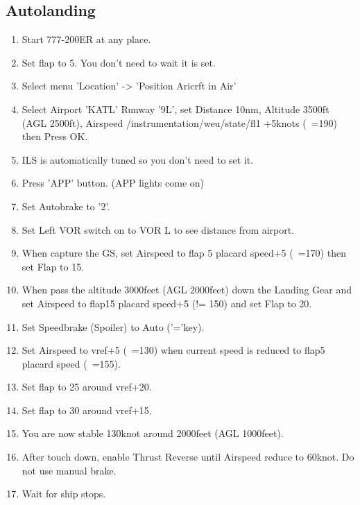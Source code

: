\subsection{Autolanding}
\begin{enumerate}
\item Start 777-200ER at any place.
\item Set flap to 5. You don't need to wait it is set.
\item Select menu 'Location' -> 'Position Aricrft in Air'
\item Select Airport 'KATL' Runway '9L', set Distance 10nm, Altitude 3500ft (AGL 2500ft), Airspeed /instrumentation/weu/state/fl1 +5knots (~=190) then Press OK.
\item ILS is automatically tuned so you don't need to set it.
\item Press 'APP' button. (APP lights come on)
\item Set Autobrake to '2'.
\item Set Left VOR switch on to VOR L to see distance from airport.
\item When capture the GS, set Airspeed to flap 5 placard speed+5 (~=170) then set Flap to 15.
\item When pass the altitude 3000feet (AGL 2000feet) down the Landing Gear and set Airspeed to flap15 placard speed+5 (!= 150) and set Flap to 20.
\item Set Speedbrake (Spoiler) to Auto ('='key).
\item Set Airspeed to vref+5 (~=130) when current speed is reduced to flap5 placard speed (~=155).
\item Set flap to 25 around vref+20.
\item Set flap to 30 around vref+15.
\item You are now stable 130knot around 2000feet (AGL 1000feet).
\item After touch down, enable Thrust Reverse until Airspeed reduce to 60knot. Do not use manual brake.
\item Wait for ship stops.
\end{enumerate}
